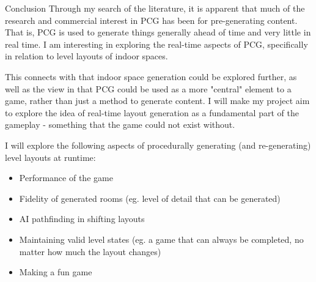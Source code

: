 \documentclass[review]{cmpreport}
\begin{document}
\begin{section}{Conclusion}
Through my search of the literature, it is apparent that much of the research and commercial interest in PCG has been for pre-generating content. That is, PCG is used to generate things generally ahead of time and very little in real time. I am interesting in exploring the real-time aspects of PCG, specifically in relation to level layouts of indoor spaces. \par 
This connects with \cite{Hendrikx:2013:PCG:2422956.2422957} that indoor space generation could be explored further, as well as the view in \cite{shaker2016procedural} that PCG could be used as a more "central" element to a game, rather than just a method to generate content. I will make my project aim to explore the idea of real-time layout generation as a fundamental part of the gameplay - something that the game could not exist without. \par
I will explore the following aspects of procedurally generating (and re-generating) level layouts at runtime:
\begin{itemize}
    \item Performance of the game
    \item Fidelity of generated rooms (eg. level of detail that can be generated)
    \item AI pathfinding in shifting layouts
    \item Maintaining valid level states (eg. a game that can always be completed, no matter how much the layout changes)
    \item Making a fun game
\end{itemize}


\end{section}



\end{document}
